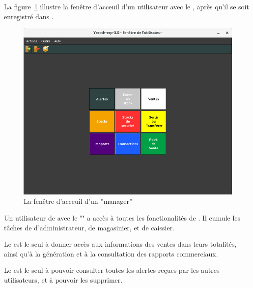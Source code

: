 \label{sec:utilisateurs-lepatron}

La figure~\ref{fig:yeren-fenetre-patron} illustre la fen\^etre
d'acceuil d'un utilisateur avec le \role \patron, 
apr\`es qu'il se soit enregistr\'e dans \yeren.\\

\begin{figure}[!htbp]
\centering
\includegraphics[scale=0.63]{images/yeren-fenetre-patron.png}
\caption{La fen\^etre d'acceuil d'un ''manager''}
\label{fig:yeren-fenetre-patron}
\end{figure}

Un utilisateur de \yeren avec le \role "\patron" a
acc\`es \`a toutes les fonctionalit\'es de \yeren. Il
cumule les t\^aches de d'administrateur, de magasinier,
et de caissier.

Le \role \patron est le seul \`a donner acc\`es aux
informations des ventes dans leurs totalit\'es, ainsi
qu'\`a la g\'en\'eration et \`a la consultation des
rapports commerciaux.

Le \role \patron est le seul \`a pouvoir consulter toutes
les alertes re\c{c}ues par les autres utilisateurs, et
\`a pouvoir les supprimer.